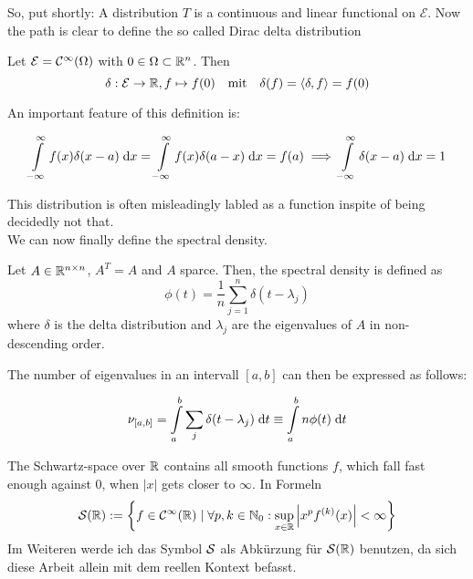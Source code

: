 So, put shortly: A distribution $T$ is a continuous and linear functional on $\mathcal{E}$.
Now the path is clear to define the so called Dirac delta distribution

\begin{definition}
    Let $\mathcal{E} = \mathcal{C}^{\infty}(\Omega)$ with $0 \in \Omega \subset \mathbb{R}^n$.
    Then
    $$\delta: \mathcal{E} \to \mathbb{R}, f \mapsto f(0) \quad \text{mit} \quad \delta(f) = \langle \delta, f \rangle = f(0)$$
\end{definition}

An important feature of this definition is:

$$\int\limits_{-\infty}^{\infty} f(x) \delta(x-a) \;\mathrm{d}x = \int\limits_{-\infty}^{\infty} f(x) \delta(a-x) \;\mathrm{d}x = f(a) \implies \int\limits_{-\infty}^{\infty} \delta(x-a) \;\mathrm{d}x = 1$$

This distribution is often misleadingly labled as a function inspite of being decidedly not that.\\
We can now finally define the spectral density.

\begin{definition} 
    Let $A \in \mathbb{R}^{n \times n}$, $A^T = A$ and $A$ sparce.
    Then, the spectral density is defined as
    $$\phi(t) = \frac{1}{n} \sum_{j=1}^{n} \delta(t - \lambda_j)$$
    where $\delta$ is the delta distribution and $\lambda_j$ are the eigenvalues of $A$ in non-descending order.
\end{definition}

The number of eigenvalues in an intervall $[a, b]$ can then be expressed as follows:

\begin{equation} \label{eq:nu_a_b}
    \nu_{[a, b]} = \int\limits_a^b \sum_j \delta(t - \lambda_j) \;\mathrm{d}t \equiv \int\limits_a^b n \phi(t) \;\mathrm{d}t
\end{equation}

\begin{definition}  \label{def:Schwartz space}
    The Schwartz-space over $\mathbb{R}$ contains all smooth functions $f$,
    which fall fast enough against $0$, when $|x|$ gets closer to $\infty$. \cite{richtmyer}
    In Formeln
    $$\mathcal{S}(\mathbb{R}) := \left\{f \in \mathcal{C}^{\infty}(\mathbb{R}) \mid \forall p, k \in \mathbb{N}_0: \sup_{x \in \mathbb{R}} \left| x^pf^{(k)}(x)\right| < \infty \right\}$$
    Im Weiteren werde ich das Symbol $\mathcal{S}$ als Abkürzung für $\mathcal{S}(\mathbb{R})$ benutzen,
    da sich diese Arbeit allein mit dem reellen Kontext befasst.
\end{definition}